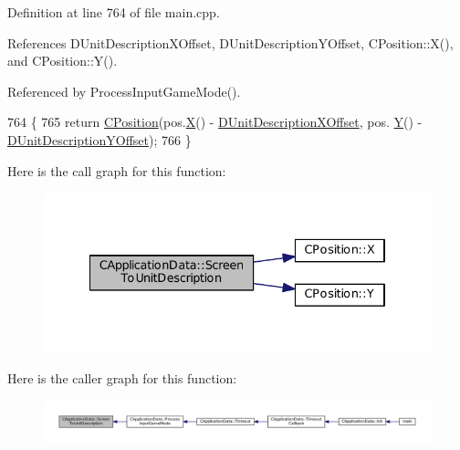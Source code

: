 Definition at line 764 of file main.\+cpp.



References D\+Unit\+Description\+X\+Offset, D\+Unit\+Description\+Y\+Offset, C\+Position\+::\+X(), and C\+Position\+::\+Y().



Referenced by Process\+Input\+Game\+Mode().


\begin{DoxyCode}
764                                                                        \{
765     \textcolor{keywordflow}{return} \hyperlink{classCPosition}{CPosition}(pos.\hyperlink{classCPosition_a9a6b94d3b91df1492d166d9964c865fc}{X}() - \hyperlink{classCApplicationData_a5653b5d0eff32ccd540ad60f5c331c24}{DUnitDescriptionXOffset}, pos.
      \hyperlink{classCPosition_a1aa8a30e2f08dda1f797736ba8c13a87}{Y}() - \hyperlink{classCApplicationData_a6c60b2da482699f1d998acfe24fec332}{DUnitDescriptionYOffset});
766 \}
\end{DoxyCode}
Here is the call graph for this function\+:\nopagebreak
\begin{figure}[H]
\begin{center}
\leavevmode
\includegraphics[width=334pt]{classCApplicationData_a5400b710281ac2671d8d76aa442124ec_cgraph}
\end{center}
\end{figure}
Here is the caller graph for this function\+:\nopagebreak
\begin{figure}[H]
\begin{center}
\leavevmode
\includegraphics[width=350pt]{classCApplicationData_a5400b710281ac2671d8d76aa442124ec_icgraph}
\end{center}
\end{figure}
\hypertarget{classCApplicationData_aebd3ae4cfd74962413024f1649233f08}{}\label{classCApplicationData_aebd3ae4cfd74962413024f1649233f08} 
